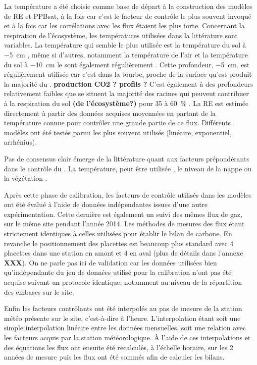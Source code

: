 La température a été choisie comme base de départ à la construction des modèles de RE et PPBsat, à la fois car c'est le facteur de contrôle le plus souvent invoqué et à la fois car les corrélations avec les flux étaient les plus forte.
Concernant la respiration de l'écosystème, les températures utilisées dans la littérature sont variables.
La température qui semble le plus utilisée est la température du sol à \SI{-5}{\centi\metre}  \citep{ballantyne2014}\plop, même si d'autres, notamment la température de l'air et la température du sol à \SI{-10}{\centi\metre} le sont également régulièrement \citep{bortoluzzi2006,kim1992}.
Cette profondeur, \SI{-5}{\cm}, est régulièrement utilisée car c'est dans la tourbe, proche de la surface qu'est produit la majorité du \coo.
\textbf{production CO2 ? profils ?}
C'est également à des profondeurs relativement faibles que se situent la majorité des racines \plop qui peuvent contribuer à la respiration du sol \textbf{(de l'écosystème?)} pour 35 à \SI{60}{\percent} \citep{silvola1996,crow2005}.
La RE est estimée directement à partir des données acquises moyennées en partant de la température connue pour contrôler une grande partie de ce flux.
Différents modèles ont été testés parmi les plus souvent utilisés (linéaire, exponentiel, arrhénius).

Pas de consensus clair émerge de la littérature quant aux facteurs prépondérants dans le contrôle du \chh.
La température, peut être utilisée \citep{alm1999,bubier1995}, le niveau de la nappe \citep{bubier1993} ou la végétation \citep{bortoluzzi2006}.

Après cette phase de calibration, les facteurs de contrôle utilisés dans les modèles ont été évalué à l'aide de données indépendantes issues d'une autre expérimentation.
Cette dernière est également un suivi des mêmes flux de gaz, sur le même site pendant l'année 2014.
Les méthodes de mesures des flux étant strictement identiques à celles utilisées pour établir le bilan de carbone.
En revanche le positionnement des placettes est beaucoup plus standard avec 4 placettes dans une station en amont et 4 en aval (plus de détails dans l'annexe \textbf{XXX}).
On ne parle pas ici de validation car les données utilisées bien qu'indépendante du jeu de données utilisé pour la calibration n'ont pas été acquise suivant un protocole identique, notamment au niveau de la répartition des embases sur le site.

Enfin les facteurs contrôlants ont été interpolés au pas de mesure de la station météo présente sur le site, c'est-à-dire à l'heure.
L'interpolation étant soit une simple interpolation linéaire entre les données mensuelles, soit une relation avec les facteurs acquis par la station météorologique.
À l'aide de ces interpolations et des équations les flux ont ensuite été recalculés, à l'échelle horaire, sur les 2 années de mesure puis les flux ont été sommés afin de calculer les bilans.

